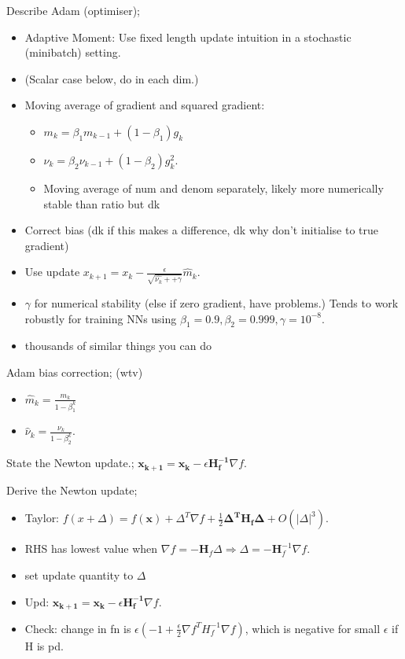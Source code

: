 \documentclass{article}
\begin{document}
Describe Adam (optimiser); \begin{itemize} \item Adaptive Moment: Use fixed length update intuition in a stochastic (minibatch) setting.  \item (Scalar case below, do in each dim.) \item Moving average of gradient and squared gradient: \begin{itemize} \item $m_k = \beta_1m_{k-1}+(1-\beta_1)g_k$ \item $\nu_k = \beta_2\nu_{k-1} + (1-\beta_2)g_k^2$.  \item Moving average of num and denom separately, likely more numerically stable than ratio but dk \end{itemize} \item Correct bias (dk if this makes a difference, dk why don't initialise to true gradient) \item Use update $x_{k+1}=x_k - \frac{\epsilon}{\sqrt{\hat{\nu_k}++\gamma}}\hat{m}_k$.  \item $\gamma$ for numerical stability (else if zero gradient, have problems.) Tends to work robustly for training NNs using $\beta_1 = 0.9, \beta_2 = 0.999, \gamma = 10^{-8}$.  \item thousands of similar things you can do \end{itemize}

Adam bias correction; (wtv) \begin{itemize} \item $\hat{m}_k = \frac{m_k}{1-\beta^k_1}$ \item $\hat{\nu}_k = \frac{\nu_k}{1-\beta^k_2}$.  \end{itemize}

State the Newton update.; $\mathbf{x_{k+1} = x_k} - \epsilon\mathbf{H^{-1}_f}\nabla f$.

Derive the Newton update; \begin{itemize} \item Taylor: $f(x+\Delta) = f(\mathbf{x}) + \Delta^T\nabla f + \frac{1}{2}\mathbf{\Delta^T H_f \Delta} + O(|\Delta|^3)$.  \item RHS has lowest value when $\nabla f = -\mathbf{H}_f\Delta \Rightarrow \Delta = -\mathbf{H}^{-1}_f \nabla f$.  \item set update quantity to $\Delta$ \item Upd: $\mathbf{x_{k+1} = x_k} - \epsilon\mathbf{H^{-1}_f}\nabla f$.  \item Check: change in fn is $\epsilon (-1+\frac{\epsilon}{2}\nabla f^T H^{-1}_f\nabla f)$, which is negative for small $\epsilon$ if H is pd.\end{itemize}
\end{document}
